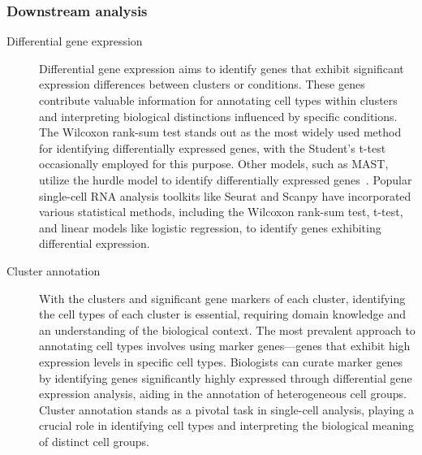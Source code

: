 \subsubsection{Downstream analysis}
\begin{description}
	\item[Differential gene expression]
	Differential gene expression aims to identify genes that exhibit significant expression differences between clusters or conditions. These genes contribute valuable information for annotating cell types within clusters and interpreting biological distinctions influenced by specific conditions. The Wilcoxon rank-sum test stands out as the most widely used method for identifying differentially expressed genes, with the Student's t-test occasionally employed for this purpose. Other models, such as MAST, utilize the hurdle model to identify differentially expressed genes~\citep{finak2015mast}. Popular single-cell RNA analysis toolkits like Seurat and Scanpy have incorporated various statistical methods, including the Wilcoxon rank-sum test, t-test, and linear models like logistic regression, to identify genes exhibiting differential expression.

	\item[Cluster annotation]
	With the clusters and significant gene markers of each cluster, identifying the cell types of each cluster is essential, requiring domain knowledge and an understanding of the biological context. The most prevalent approach to annotating cell types involves using marker genes—genes that exhibit high expression levels in specific cell types. Biologists can curate marker genes by identifying genes significantly highly expressed through differential gene expression analysis, aiding in the annotation of heterogeneous cell groups. Cluster annotation stands as a pivotal task in single-cell analysis, playing a crucial role in identifying cell types and interpreting the biological meaning of distinct cell groups.


\end{description}
